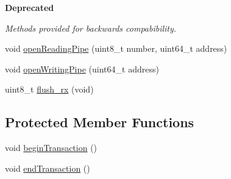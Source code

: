 \begin{Indent}\textbf{ Deprecated}\par
{\em Methods provided for backwards compabibility. }\begin{DoxyCompactItemize}
\item 
void \hyperlink{classRF24_aa7e8523f86f9f8f20c274e0c89a5fd45}{open\+Reading\+Pipe} (uint8\+\_\+t number, uint64\+\_\+t address)
\item 
void \hyperlink{classRF24_a50c8e68ee840e1860a31dbdc83afbd77}{open\+Writing\+Pipe} (uint64\+\_\+t address)
\item 
uint8\+\_\+t \hyperlink{classRF24_a575c061519e7820e1850ad380c617d95}{flush\+\_\+rx} (void)
\end{DoxyCompactItemize}
\end{Indent}
\subsection*{Protected Member Functions}
\begin{DoxyCompactItemize}
\item 
void \hyperlink{classRF24_a5a669f1c68203d5317f8f452a2bff1b5}{begin\+Transaction} ()
\item 
void \hyperlink{classRF24_a2b196efad61a1b8a9bf493150901edb4}{end\+Transaction} ()
\end{DoxyCompactItemize}
